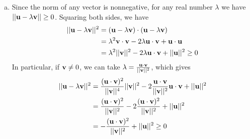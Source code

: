 \documentclass[12pt,letterpaper,reqno]{article}
\numberwithin{equation}{section}
\begin{document}
\begin{pf}
	\begin{enumerate}[(a)]
			\item Since the norm of any vector is nonnegative, for any real number $\lambda$ we have $||{\bf u}-\lambda{\bf v}|| \geq 0$. Squaring both sides, we have
	\begin{align*}
		||{\bf u}-\lambda{\bf v}||^2&=({\bf u}-\lambda{\bf v})\cdot ({\bf u}-\lambda{\bf v}) \\
		&=\lambda^2{\bf v}\cdot {\bf v}-2\lambda {\bf u}\cdot {\bf v}+{\bf u}\cdot {\bf u} \\
		&=\lambda^2||{\bf v}||^2-2\lambda{\bf u}\cdot {\bf v}+||{\bf u}||^2 \geq 0
	\end{align*} 
In particular, if ${\bf v} \neq 0$, we can take $\lambda=\frac{{\bf u}\cdot {\bf v}}{||{\bf v}||^2}$, which gives
\begin{align*}
	||{\bf u}-\lambda{\bf v}||^2&=\frac{({\bf u}\cdot {\bf v})^2}{||{\bf v}||^4}||{\bf v}||^2-2\frac{{\bf u}\cdot {\bf v}}{||{\bf v}||^2}{\bf u}\cdot {\bf v}+||{\bf u}||^2 \\
	&=\frac{({\bf u}\cdot {\bf v})^2}{||{\bf v}||^2}-2\frac{({\bf u}\cdot {\bf v})^2}{||{\bf v}||^2}+||{\bf u}||^2 \\
	&=-\frac{({\bf u}\cdot {\bf v})^2}{||{\bf v}||^2}+||{\bf u}||^2 \geq 0\\
\end{align*}


\end{enumerate}
\end{pf}
\end{document}
